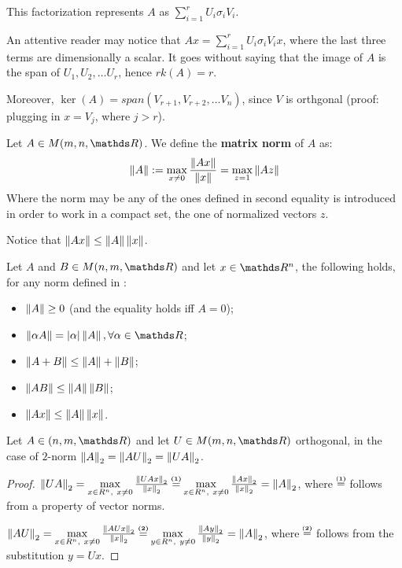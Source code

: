 \documentclass[ComputationalMathematics.tex]{subfiles}
\begin{document}
This factorization represents $A$ as $\sum\limits_{i=1}^r U_i \sigma_i V_i$. 

An attentive reader may notice that $Ax = \sum\limits_{i=1}^r U_i \sigma_i V_i x$, where the last three terms are dimensionally a scalar.
It goes without saying that the image of $A$ is the span of $U_1, U_2, \ldots U_r$, hence $rk(A) = r$.

Moreover, $\ker(A)=span(V_{r+1}, V_{r+2}, \ldots V_{n})$, since $V$ is orthgonal (proof: plugging in $x=V_j$, where $j>r$). 

\begin{definition}
  Let $A \in M(m, n, \R)$. We define the \textbf{matrix norm} of $A$ as:
  \[
    \left\lVert A\right\rVert := \max\limits_{x \neq 0} \frac{\left\lVert Ax\right\rVert}{\left\lVert x\right\rVert} = \max\limits_{z=1}\left\lVert Az\right\rVert
  \]
  Where the norm may be any of the ones defined in  second equality is introduced in order to work in a compact set, the one of normalized vectors $z$.
\end{definition}

Notice that $\left\lVert Ax\right\rVert \le \left\lVert A\right\rVert \left\lVert x\right\rVert$.

\begin{property}\label{prop:28sett_norms}
  Let $A$ and $B \in M(n, m, \R)$ and let $x \in \R^n$, the following holds, for any norm defined in :
  \begin{itemize}
    \item $\left\lVert A\right\rVert \ge 0$ (and the equality holds iff $A=0$);
    \item $\norm{\alpha A} = |\alpha| \norm{A}, \forall \alpha \in \R$;
    \item $\left\lVert A+B\right\rVert \le \left\lVert A\right\rVert + \left\lVert B\right\rVert$;
    \item $\left\lVert AB\right\rVert \le \left\lVert A\right\rVert \left\lVert B\right\rVert$;
    \item $\left\lVert Ax\right\rVert \le \left\lVert A\right\rVert \left\lVert x\right\rVert$.
  \end{itemize}
\end{property}

\begin{proposition}\label{fact:28sett_orthogonorm}
  Let $A \in (n, m, \R)$ and let $U \in M(m, n, \R)$ orthogonal, in the case of $2$-norm $\left\lVert A\right\rVert_2 = \left\lVert AU\right\rVert_2 = \left\lVert UA\right\rVert_2$.
\end{proposition}

\begin{proof}
  $\norm{UA}_2 = \max\limits_{x \in R^n,~x \ne 0} \frac{\norm{UAx}_2}{\norm{x}_2} \numeq{(1)} \max\limits_{x \in R^n,~x \ne 0} \frac{\norm{Ax}_2}{\norm{x}_2} = \norm{A}_2$, where $\numeq{(1)}$ follows from a property of vector norms.

 $\norm{AU}_2 = \max\limits_{x \in R^n,~x \ne 0} \frac{\norm{AUx}_2}{\norm{x}_2} \numeq{(2)} \max\limits_{y \in R^n,~y \ne 0} \frac{\norm{Ay}_2}{\norm{y}_2} = \norm{A}_2$, where $\numeq{(2)}$ follows from the substitution $y=Ux$.
\end{proof}
\end{document}
